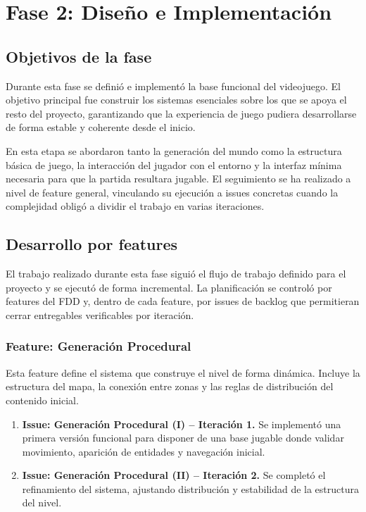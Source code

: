 \chapter{Fase 2: Diseño e Implementación}

\begin{abstract}
Este capítulo recoge el trabajo realizado durante la Fase 2 del proyecto, organizada por features
del FDD. Para cada feature se explica su objetivo general y, cuando ha sido necesario, su desglose
en varias issues de backlog distribuidas en distintas iteraciones.
\end{abstract}

\section{Objetivos de la fase}
Durante esta fase se definió e implementó la base funcional del videojuego. El objetivo principal
fue construir los sistemas esenciales sobre los que se apoya el resto del proyecto, garantizando
que la experiencia de juego pudiera desarrollarse de forma estable y coherente desde el inicio.

En esta etapa se abordaron tanto la generación del mundo como la estructura básica de juego,
la interacción del jugador con el entorno y la interfaz mínima necesaria para que la partida
resultara jugable. El seguimiento se ha realizado a nivel de feature general, vinculando su
ejecución a issues concretas cuando la complejidad obligó a dividir el trabajo en varias iteraciones.

\section{Desarrollo por features}
El trabajo realizado durante esta fase siguió el flujo de trabajo definido para el proyecto y
se ejecutó de forma incremental. La planificación se controló por features del FDD y, dentro de
cada feature, por issues de backlog que permitieran cerrar entregables verificables por iteración.

\subsection{Feature: Generación Procedural}
Esta feature define el sistema que construye el nivel de forma dinámica. Incluye la estructura del
mapa, la conexión entre zonas y las reglas de distribución del contenido inicial.

\begin{enumerate}
\item \textbf{Issue: Generación Procedural (I) -- Iteración 1.} Se implementó una primera versión funcional para disponer de una base jugable donde validar movimiento, aparición de entidades y navegación inicial.
\item \textbf{Issue: Generación Procedural (II) -- Iteración 2.} Se completó el refinamiento del sistema, ajustando distribución y estabilidad de la estructura del nivel.
\end{enumerate}

